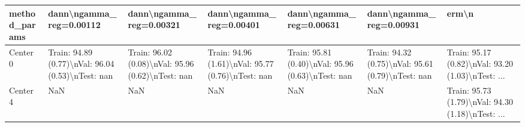 \begin{tabular}{lllllll}
\toprule
method\_params &                            dann\textbackslash ngamma\_reg=0.00112 &                            dann\textbackslash ngamma\_reg=0.00321 &                            dann\textbackslash ngamma\_reg=0.00401 &                            dann\textbackslash ngamma\_reg=0.00631 &                            dann\textbackslash ngamma\_reg=0.00931 &                                              erm\textbackslash n \\
\midrule
Center 0 &  Train: 94.89 (0.77)\textbackslash nVal: 96.04 (0.53)\textbackslash nTest: nan &  Train: 96.02 (0.08)\textbackslash nVal: 95.96 (0.62)\textbackslash nTest: nan &  Train: 94.96 (1.61)\textbackslash nVal: 95.77 (0.76)\textbackslash nTest: nan &  Train: 95.81 (0.40)\textbackslash nVal: 95.96 (0.63)\textbackslash nTest: nan &  Train: 94.32 (0.75)\textbackslash nVal: 95.61 (0.79)\textbackslash nTest: nan &  Train: 95.17 (0.82)\textbackslash nVal: 93.20 (1.03)\textbackslash nTest: ... \\
Center 4 &                                                NaN &                                                NaN &                                                NaN &                                                NaN &                                                NaN &  Train: 95.73 (1.79)\textbackslash nVal: 94.30 (1.18)\textbackslash nTest: ... \\
\bottomrule
\end{tabular}
